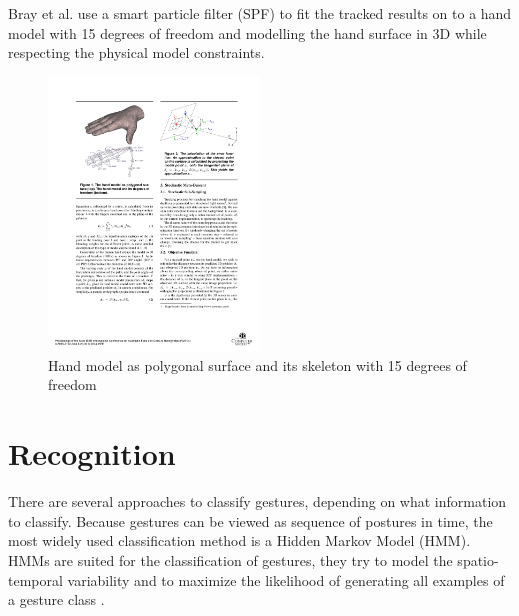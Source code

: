 Bray et al. use a smart particle filter (SPF) to fit the tracked results on to a hand model with 15 degrees of freedom and modelling the hand surface in 3D \cite{bray} while respecting the physical model constraints. 
\begin{figure}[h!]
\center
\includegraphics[width=0.5\textwidth]{images/bray_gool_handmodel}
\caption{Hand model as polygonal surface and its skeleton with 15 degrees of freedom \cite{bray}}
\label{fig:bray-gool-hand}
\end{figure}

\section{Recognition}
\label{sec:recognition}

There are several approaches to classify gestures, depending on what information to classify. Because gestures can be viewed as sequence of postures in time, the most widely used classification method is a Hidden Markov Model (HMM). HMMs are suited for the classification of gestures, they try to model the spatio-temporal variability and to maximize the likelihood of generating all examples of a gesture class \cite{Yang}.
 
